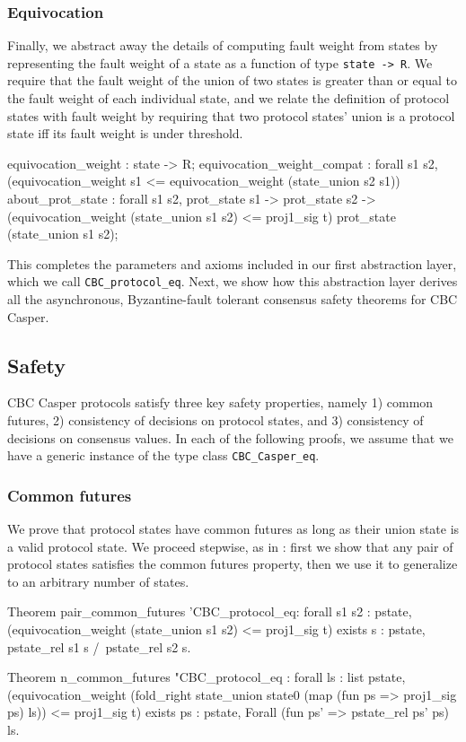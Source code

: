 \documentclass[runningheads]{llncs}
\begin{document}
\subsubsection{Equivocation}
Finally, we abstract away the details of computing fault weight from states by representing the fault weight of a state as a function of type \verb|state -> R|. We require that the fault weight of the union of two states is greater than or equal to the fault weight of each individual state, and we relate the definition of protocol states with fault weight by requiring that two protocol states' union is a protocol state iff its fault weight is under threshold.
\begin{coq}
	equivocation_weight : state -> R;
	equivocation_weight_compat : forall s1 s2,
	(equivocation_weight s1 <=
	equivocation_weight (state_union s2 s1))%
	about_prot_state : forall s1 s2,
	prot_state s1 -> prot_state s2 ->
	(equivocation_weight (state_union s1 s2)
	<= proj1_sig t)%
	prot_state (state_union s1 s2);
\end{coq}
This completes the parameters and axioms included in our first abstraction layer, which we call \verb|CBC_protocol_eq|. Next, we show how this abstraction layer derives all the asynchronous, Byzantine-fault tolerant consensus safety theorems for CBC Casper.

\subsection{Safety}
CBC Casper protocols satisfy three key safety properties, namely 1) common futures, 2) consistency of decisions on protocol states, and 3) consistency of decisions on consensus values. In each of the following proofs, we assume that we have a generic instance of the type class \verb|CBC_Casper_eq|.
\subsubsection{Common futures}
We prove that protocol states have common futures as long as their union state is a valid protocol state. We proceed stepwise, as in \cite{CBCfull}: first we show that any pair of protocol states satisfies the common futures property, then we use it to generalize to an arbitrary number of states.
\begin{coq}
	Theorem pair_common_futures '{CBC_protocol_eq}:
	forall s1 s2 : pstate,
	(equivocation_weight (state_union s1 s2) <= proj1_sig t)%
	exists s : pstate, pstate_rel s1 s /\ pstate_rel s2 s.
	
	Theorem n_common_futures "{CBC_protocol_eq} :
	forall ls : list pstate,
	(equivocation_weight (fold_right state_union state0 (map (fun ps => proj1_sig ps) ls))
	<= proj1_sig t)%
	exists ps : pstate, Forall (fun ps' => pstate_rel ps' ps) ls.
\end{coq}	
\end{document}
